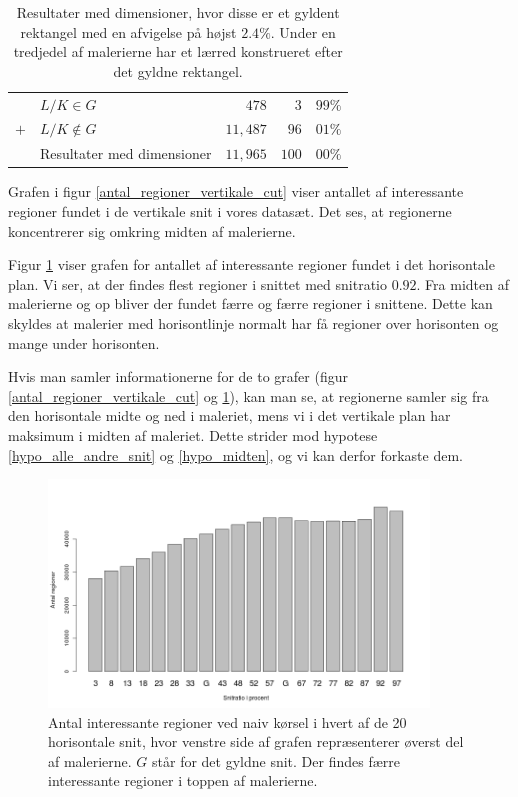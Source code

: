 {\begin{table}[H]
    \centering
    \begin{tabular}{r@{\ \ }p{14em}r|r@{.}l}
            & $L/K \in G$                  &    $478$ &   $3$ & $99\%$ \\
        $+$ & $L/K \notin G$               & $11,487$ &  $96$ & $01\%$ \\\hline
            & Resultater med dimensioner   & $11,965$ & $100$ & $00\%$
    \end{tabular}
    \caption[]{Resultater med dimensioner, hvor disse er et gyldent
    rektangel med en afvigelse på højst $2.4\%$. Under en tredjedel af
    malerierne har et lærred konstrueret efter det gyldne rektangel.}
    \label{tabel_real_dimensions}
\end{table}

Grafen i figur \ref{antal_regioner_vertikale_cut} viser antallet af
interessante regioner fundet i de vertikale snit i vores datasæt. Det
ses, at regionerne koncentrerer sig omkring midten af malerierne.

Figur \ref{antal_regioner_horisontale_cut} viser grafen for antallet af
interessante regioner fundet i det horisontale plan. Vi ser, at der
findes flest regioner i snittet med snitratio $0.92$. Fra midten af
malerierne og op bliver der fundet færre og færre regioner i snittene.
Dette kan skyldes at malerier med horisontlinje normalt har få regioner over
horisonten og mange under horisonten.

Hvis man samler informationerne for de to grafer (figur
\ref{antal_regioner_vertikale_cut} og
\ref{antal_regioner_horisontale_cut}), kan man se, at regionerne samler
sig fra den horisontale midte og ned i maleriet, mens vi i det vertikale
plan har maksimum i midten af maleriet. Dette strider mod hypotese
\ref{hypo_alle_andre_snit} og \ref{hypo_midten}, og vi kan derfor
forkaste dem.

\begin{figure}[h!]
	\centering
	\includegraphics[width=0.9\textwidth]{afsnit/resultater/billeder/cut2cut3eatsperratio.png}
    \caption{Antal interessante regioner ved naiv kørsel i hvert af de
    20 horisontale snit, hvor venstre side af grafen repræsenterer
    øverst del af malerierne. $G$ står for det gyldne snit. Der findes
    færre interessante regioner i toppen af malerierne.}
	\label{antal_regioner_horisontale_cut}
\end{figure}

}
